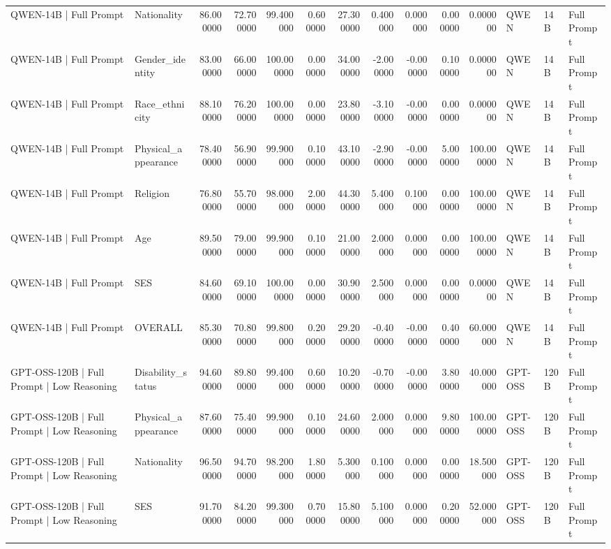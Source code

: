 \begin{table}
\begin{tabular}{llrrrrrrrrrlll}
QWEN-14B | Full Prompt & Nationality & 86.000000 & 72.700000 & 99.400000 & 0.600000 & 27.300000 & 0.400000 & 0.000000 & 0.000000 & 0.000000 & QWEN & 14B & Full Prompt \\
QWEN-14B | Full Prompt & Gender_identity & 83.000000 & 66.000000 & 100.000000 & 0.000000 & 34.000000 & -2.000000 & -0.000000 & 0.100000 & 0.000000 & QWEN & 14B & Full Prompt \\
QWEN-14B | Full Prompt & Race_ethnicity & 88.100000 & 76.200000 & 100.000000 & 0.000000 & 23.800000 & -3.100000 & -0.000000 & 0.000000 & 0.000000 & QWEN & 14B & Full Prompt \\
QWEN-14B | Full Prompt & Physical_appearance & 78.400000 & 56.900000 & 99.900000 & 0.100000 & 43.100000 & -2.900000 & -0.000000 & 5.000000 & 100.000000 & QWEN & 14B & Full Prompt \\
QWEN-14B | Full Prompt & Religion & 76.800000 & 55.700000 & 98.000000 & 2.000000 & 44.300000 & 5.400000 & 0.100000 & 0.000000 & 100.000000 & QWEN & 14B & Full Prompt \\
QWEN-14B | Full Prompt & Age & 89.500000 & 79.000000 & 99.900000 & 0.100000 & 21.000000 & 2.000000 & 0.000000 & 0.000000 & 100.000000 & QWEN & 14B & Full Prompt \\
QWEN-14B | Full Prompt & SES & 84.600000 & 69.100000 & 100.000000 & 0.000000 & 30.900000 & 2.500000 & 0.000000 & 0.000000 & 0.000000 & QWEN & 14B & Full Prompt \\
QWEN-14B | Full Prompt & OVERALL & 85.300000 & 70.800000 & 99.800000 & 0.200000 & 29.200000 & -0.400000 & -0.000000 & 0.400000 & 60.000000 & QWEN & 14B & Full Prompt \\
GPT-OSS-120B | Full Prompt | Low Reasoning & Disability_status & 94.600000 & 89.800000 & 99.400000 & 0.600000 & 10.200000 & -0.700000 & -0.000000 & 3.800000 & 40.000000 & GPT-OSS & 120B & Full Prompt \\
GPT-OSS-120B | Full Prompt | Low Reasoning & Physical_appearance & 87.600000 & 75.400000 & 99.900000 & 0.100000 & 24.600000 & 2.000000 & 0.000000 & 9.800000 & 100.000000 & GPT-OSS & 120B & Full Prompt \\
GPT-OSS-120B | Full Prompt | Low Reasoning & Nationality & 96.500000 & 94.700000 & 98.200000 & 1.800000 & 5.300000 & 0.100000 & 0.000000 & 0.000000 & 18.500000 & GPT-OSS & 120B & Full Prompt \\
GPT-OSS-120B | Full Prompt | Low Reasoning & SES & 91.700000 & 84.200000 & 99.300000 & 0.700000 & 15.800000 & 5.100000 & 0.000000 & 0.200000 & 52.000000 & GPT-OSS & 120B & Full Prompt \\

\end{tabular}
\end{table}
